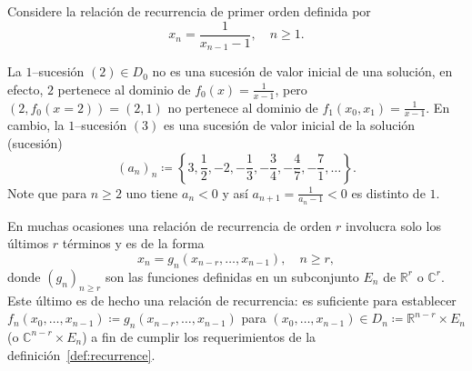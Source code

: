 \begin{example}
	Considere la relación de recurrencia de primer orden definida por \[x_{n}=\frac{1}{x_{n-1}-1},\quad n\geq1.\]

	La $1$--sucesión $\left(2\right)\in D_{0}$ no es una sucesión de valor inicial de una solución, en efecto, $2$ pertenece al dominio de $f_{0}\left(x\right)=\frac{1}{x-1}$, pero $\left(2,f_{0}(x=2)\right)=\left(2,1\right)$ no pertenece al dominio de $f_{1}\left(x_{0},x_{1}\right)=\frac{1}{x-1}$. En cambio, la $1$--sucesión $\left(3\right)$ es una sucesión de valor inicial de la solución (sucesión) \[ {\left(a_{n}\right)}_{n}\coloneqq\left\{3,\frac{1}{2},-2,-\frac{1}{3},-\frac{3}{4},-\frac{4}{7},-\frac{7}{1},\ldots\right\}. \] Note que para $n\geq2$ uno tiene $a_{n}<0$ y así $a_{n+1}=\frac{1}{a_{n}-1}<0$ es distinto de $1$.
\end{example}

\begin{example}
	En muchas ocasiones una relación de recurrencia de orden $r$ involucra solo los últimos $r$ términos y es de la forma	\[ x_{n}=g_{n}\left(x_{n-r},\ldots,x_{n-1}\right),\quad n\geq r, \] donde ${\left(g_{n}\right)}_{n\geq r}$ son las funciones definidas en un subconjunto $E_{n}$ de $\mathds{R}^{r}$ o $\mathds{C}^{r}$. Este último es de hecho una relación de recurrencia: es suficiente para establecer $f_{n}\left(x_{0},\ldots,x_{n-1}\right)\coloneqq g_{n}\left(x_{n-r},\ldots,x_{n-1}\right)$ para $\left(x_{0},\ldots,x_{n-1}\right)\in D_{n}\coloneqq\mathds{R}^{n-r}\times E_{n}$ (o $\mathds{C}^{n-r}\times E_{n}$) a fin de cumplir los requerimientos de la definición~\eqref{def:recurrence}.
\end{example}

%

